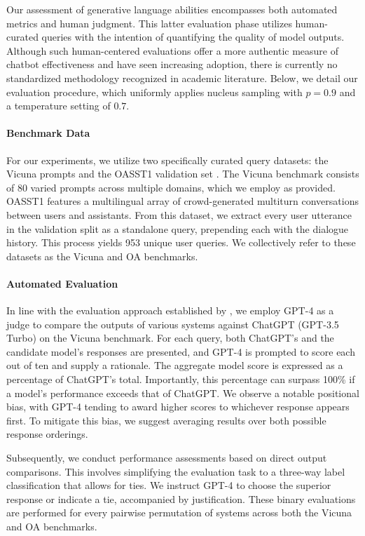Our assessment of generative language abilities encompasses both automated metrics and human judgment. This latter evaluation phase utilizes human-curated queries with the intention of quantifying the quality of model outputs. Although such human-centered evaluations offer a more authentic measure of chatbot effectiveness and have seen increasing adoption, there is currently no standardized methodology recognized in academic literature. Below, we detail our evaluation procedure, which uniformly applies nucleus sampling with $p=0.9$ and a temperature setting of $0.7$.

\paragraph{Benchmark Data} For our experiments, we utilize two specifically curated query datasets: the Vicuna prompts \citep{vicuna2023} and the OASST1 validation set \citep{kopf2023openassistant}. The Vicuna benchmark consists of 80 varied prompts across multiple domains, which we employ as provided. OASST1 features a multilingual array of crowd-generated multiturn conversations between users and assistants. From this dataset, we extract every user utterance in the validation split as a standalone query, prepending each with the dialogue history. This process yields 953 unique user queries. We collectively refer to these datasets as the Vicuna and OA benchmarks.

\paragraph{Automated Evaluation} In line with the evaluation approach established by \citet{vicuna2023}, we employ GPT-4 as a judge to compare the outputs of various systems against ChatGPT (GPT-3.5 Turbo) on the Vicuna benchmark. For each query, both ChatGPT’s and the candidate model’s responses are presented, and GPT-4 is prompted to score each out of ten and supply a rationale. The aggregate model score is expressed as a percentage of ChatGPT’s total. Importantly, this percentage can surpass 100\% if a model’s performance exceeds that of ChatGPT. We observe a notable positional bias, with GPT-4 tending to award higher scores to whichever response appears first. To mitigate this bias, we suggest averaging results over both possible response orderings.

Subsequently, we conduct performance assessments based on direct output comparisons. This involves simplifying the evaluation task to a three-way label classification that allows for ties. We instruct GPT-4 to choose the superior response or indicate a tie, accompanied by justification. These binary evaluations are performed for every pairwise permutation of systems across both the Vicuna and OA benchmarks.

